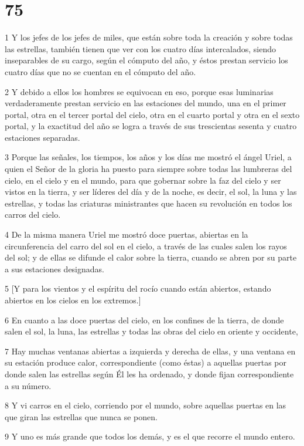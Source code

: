 \chapter{75}

\par 1 Y los jefes de los jefes de miles, que están sobre toda la creación y sobre todas las estrellas, también tienen que ver con los cuatro días intercalados, siendo inseparables de su cargo, según el cómputo del año, y éstos prestan servicio los cuatro días que no se cuentan en el cómputo del año.
\par 2 Y debido a ellos los hombres se equivocan en eso, porque esas luminarias verdaderamente prestan servicio en las estaciones del mundo, una en el primer portal, otra en el tercer portal del cielo, otra en el cuarto portal y otra en el sexto portal, y la exactitud del año se logra a través de sus trescientas sesenta y cuatro estaciones separadas.
\par 3 Porque las señales, los tiempos, los años y los días me mostró el ángel Uriel, a quien el Señor de la gloria ha puesto para siempre sobre todas las lumbreras del cielo, en el cielo y en el mundo, para que gobernar sobre la faz del cielo y ser vistos en la tierra, y ser líderes del día y de la noche, es decir, el sol, la luna y las estrellas, y todas las criaturas ministrantes que hacen su revolución en todos los carros del cielo.
\par 4 De la misma manera Uriel me mostró doce puertas, abiertas en la circunferencia del carro del sol en el cielo, a través de las cuales salen los rayos del sol; y de ellas se difunde el calor sobre la tierra, cuando se abren por su parte a sus estaciones designadas.
\par 5 [Y para los vientos y el espíritu del rocío cuando están abiertos, estando abiertos en los cielos en los extremos.]
\par 6 En cuanto a las doce puertas del cielo, en los confines de la tierra, de donde salen el sol, la luna, las estrellas y todas las obras del cielo en oriente y occidente,
\par 7 Hay muchas ventanas abiertas a izquierda y derecha de ellas, y una ventana en su estación produce calor, correspondiente (como éstas) a aquellas puertas por donde salen las estrellas según Él les ha ordenado, y donde fijan correspondiente a su número.
\par 8 Y vi carros en el cielo, corriendo por el mundo, sobre aquellas puertas en las que giran las estrellas que nunca se ponen.
\par 9 Y uno es más grande que todos los demás, y es el que recorre el mundo entero.

